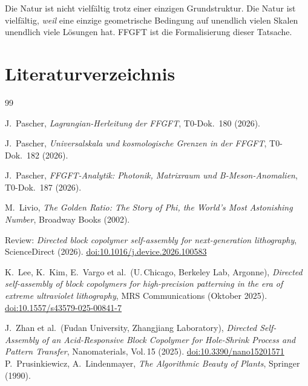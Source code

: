 \begin{keybox}[Kernaussage]
Die Natur ist nicht vielfältig trotz einer einzigen Grundstruktur.
Die Natur ist vielfältig, \emph{weil} eine einzige geometrische
Bedingung auf unendlich vielen Skalen unendlich viele Lösungen hat.
FFGFT ist die Formalisierung dieser Tatsache.
\end{keybox}

\newpage
\section*{Literaturverzeichnis}

\begin{thebibliography}{99}

J.~Pascher, \textit{Lagrangian-Herleitung der FFGFT}, T0-Dok.~180 (2026).

J.~Pascher, \textit{Universalskala und kosmologische Grenzen in der FFGFT},
T0-Dok.~182 (2026).

J.~Pascher, \textit{FFGFT-Analytik: Photonik, Matrixraum und B-Meson-Anomalien},
T0-Dok.~187 (2026).

M.~Livio, \textit{The Golden Ratio: The Story of Phi, the World's Most
Astonishing Number}, Broadway Books (2002).

Review: \textit{Directed block copolymer self-assembly for next-generation lithography},
ScienceDirect (2026).
\href{https://doi.org/10.1016/j.device.2026.100583}{doi:10.1016/j.device.2026.100583}

K.~Lee, K.~Kim, E.~Vargo et al.\ (U.\,Chicago, Berkeley Lab, Argonne),
\textit{Directed self-assembly of block copolymers for high-precision patterning
in the era of extreme ultraviolet lithography},
MRS Communications (Oktober 2025).
\href{https://doi.org/10.1557/s43579-025-00841-7}{doi:10.1557/s43579-025-00841-7}

J.~Zhan et al.\ (Fudan University, Zhangjiang Laboratory),
\textit{Directed Self-Assembly of an Acid-Responsive Block Copolymer
for Hole-Shrink Process and Pattern Transfer},
Nanomaterials, Vol.\,15 (2025).
\href{https://doi.org/10.3390/nano15201571}{doi:10.3390/nano15201571}
P.~Prusinkiewicz, A.~Lindenmayer,
\textit{The Algorithmic Beauty of Plants},
Springer (1990).

\end{thebibliography}

